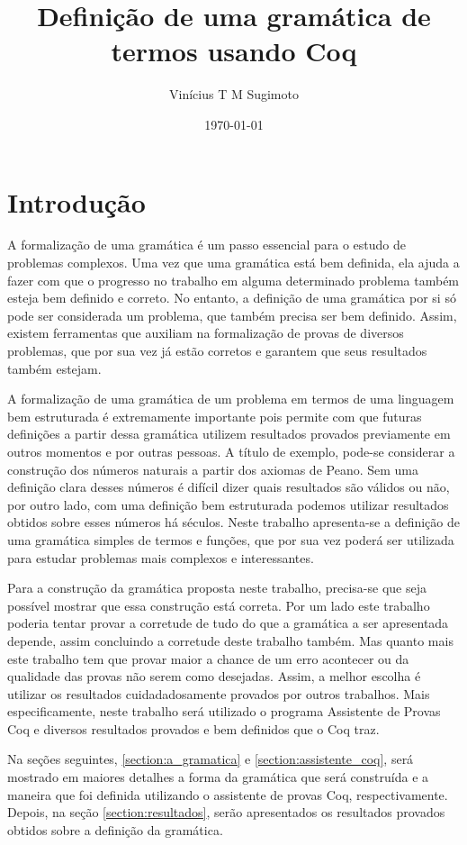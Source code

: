 \documentclass{article}
\title{Definição de uma gramática de termos usando Coq}
\author{Vinícius T M Sugimoto}
\date{\today}
\begin{document}
\maketitle

\section{Introdução}
\label{section:introducao}

A formalização de uma gramática é um passo essencial para o estudo de problemas complexos.  Uma vez que uma gramática está bem definida, ela ajuda a fazer com que o progresso no trabalho em alguma determinado problema também esteja bem definido e correto. No entanto, a definição de uma gramática por si só pode ser considerada um problema, que também precisa ser bem definido.  Assim, existem ferramentas que auxiliam na formalização de provas de diversos problemas, que por sua vez já estão corretos e garantem que seus resultados também estejam.

A formalização de uma gramática de um problema em termos de uma linguagem bem estruturada é extremamente importante pois permite com que futuras definições a partir dessa gramática utilizem resultados provados previamente em outros momentos e por outras pessoas. A título de exemplo, pode-se considerar a construção dos números naturais a partir dos axiomas de Peano. Sem uma definição clara desses números é difícil dizer quais resultados são válidos ou não, por outro lado, com uma definição bem estruturada podemos utilizar resultados obtidos sobre esses números há séculos. Neste trabalho apresenta-se a definição de uma gramática simples de termos e funções, que por sua vez poderá ser utilizada para estudar problemas mais complexos e interessantes.

Para a construção da gramática proposta neste trabalho, precisa-se que seja possível mostrar que essa construção está correta. Por um lado este trabalho poderia tentar provar a corretude de tudo do que a gramática a ser apresentada depende, assim concluindo a corretude deste trabalho também. Mas quanto mais este trabalho tem que provar maior a chance de um erro acontecer ou da qualidade das provas não serem como desejadas. Assim, a melhor escolha é utilizar os resultados cuidadadosamente provados por outros trabalhos. Mais especificamente, neste trabalho será utilizado o programa Assistente de Provas Coq e diversos resultados provados e bem definidos que o Coq traz.

Na seções seguintes, \ref{section:a_gramatica} e \ref{section:assistente_coq}, será mostrado em maiores detalhes a forma da gramática que será construída e a maneira que foi definida utilizando o assistente de provas Coq, respectivamente. Depois, na seção \ref{section:resultados}, serão apresentados os resultados provados obtidos sobre a definição da gramática.
\end{document}
